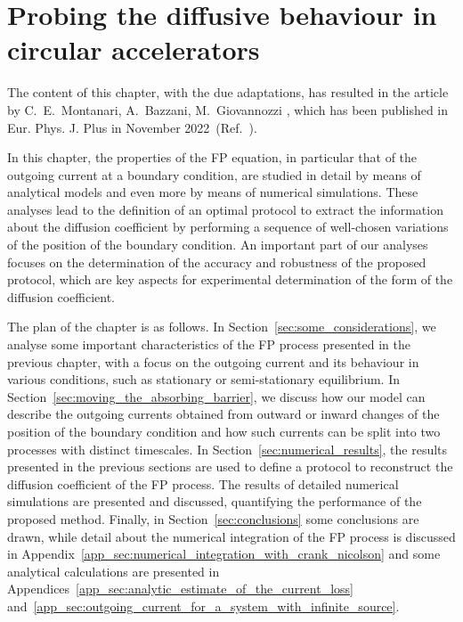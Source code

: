 \chapter{Probing the diffusive behaviour in circular accelerators}\label{ch:probing}

\noindent\textsf{The content of this chapter, with the due adaptations, has resulted in the article by C.\ E.\ Montanari, A.\ Bazzani, M.\ Giovannozzi \textit{}, which has been published in Eur. Phys. J. Plus in November 2022~(Ref.~\cite{our_paper9}).}

In this chapter, the properties of the FP equation, in particular that of the outgoing current at a boundary condition, are studied in detail by means of analytical models and even more by means of numerical simulations. These analyses lead to the definition of an optimal protocol to extract the information about the diffusion coefficient by performing a sequence of well-chosen variations of the position of the boundary condition. An important part of our analyses focuses on the determination of the accuracy and robustness of the proposed protocol, which are key aspects for experimental determination of the form of the diffusion coefficient.

The plan of the chapter is as follows. In Section~\ref{sec:some_considerations}, we analyse some important characteristics of the FP process presented in the previous chapter, with a focus on the outgoing current and its behaviour in various conditions, such as stationary or semi-stationary equilibrium. In Section~\ref{sec:moving_the_absorbing_barrier}, we discuss how our model can describe the outgoing currents obtained from outward or inward changes of the position of the boundary condition and how such currents can be split into two processes with distinct timescales. In Section~\ref{sec:numerical_results}, the results presented in the previous sections are used to define a protocol to reconstruct the diffusion coefficient of the FP process. The results of detailed numerical simulations are presented and discussed, quantifying the performance of the proposed method. Finally, in Section~\ref{sec:conclusions} some conclusions are drawn, while detail about the numerical integration of the FP process is discussed in Appendix~\ref{app_sec:numerical_integration_with_crank_nicolson} and some analytical calculations are presented in Appendices~\ref{app_sec:analytic_estimate_of_the_current_loss} and~\ref{app_sec:outgoing_current_for_a_system_with_infinite_source}.

